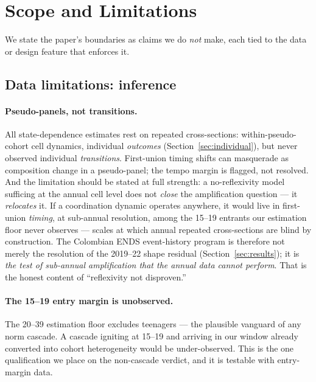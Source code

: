 \section{Scope and Limitations}
\label{sec:limitations}

We state the paper's boundaries as claims we do \emph{not} make, each tied to
the data or design feature that enforces it.

\subsection{Data limitations: inference}
\label{sec:datalim-inference}

\paragraph{Pseudo-panels, not transitions.} All state-dependence estimates rest
on repeated cross-sections: within-pseudo-cohort cell dynamics, individual
\emph{outcomes} (Section~\ref{sec:individual}), but never observed individual
\emph{transitions}. First-union timing shifts can masquerade as composition
change in a pseudo-panel; the tempo margin is flagged, not resolved. And the
limitation should be stated at full strength: a no-reflexivity model sufficing
at the annual cell level does not \emph{close} the amplification question ---
it \emph{relocates} it. If a coordination dynamic operates anywhere, it would
live in first-union \emph{timing}, at sub-annual resolution, among the 15--19
entrants our estimation floor never observes --- scales at which annual
repeated cross-sections are blind by construction. The Colombian ENDS
event-history program is therefore not merely the resolution of the 2019--22
shape residual (Section~\ref{sec:results}); it is \emph{the test of sub-annual
amplification that the annual data cannot perform}. That is the honest content
of ``reflexivity not disproven.''

\paragraph{The 15--19 entry margin is unobserved.} The 20--39 estimation floor
excludes teenagers --- the plausible vanguard of any norm cascade. A cascade
igniting at 15--19 and arriving in our window already converted into cohort
heterogeneity would be under-observed. This is the one qualification we place
on the non-cascade verdict, and it is testable with entry-margin data.

